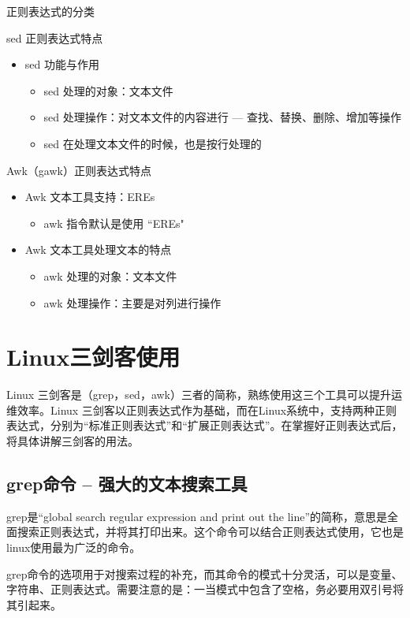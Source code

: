 \begin{ascolorbox5}{正则表达式的分类}
\begin{ascboxB}{sed 正则表达式特点}
\begin{itemize}
\item sed 功能与作用
	\begin{itemize}
	\item sed 处理的对象：文本文件
	\item sed 处理操作：对文本文件的内容进行 --- 查找、替换、删除、增加等操作
	\item sed 在处理文本文件的时候，也是按行处理的
\end{itemize}
	\end{itemize}
	\end{ascboxB}
	\begin{ascboxB}{Awk（gawk）正则表达式特点}
	\begin{itemize}
		\item Awk 文本工具支持：EREs
		\begin{itemize}
			\item awk 指令默认是使用 “EREs"
		\end{itemize}
		\item Awk 文本工具处理文本的特点
		\begin{itemize}
			\item awk 处理的对象：文本文件
			\item awk 处理操作：主要是对列进行操作
		\end{itemize}
	\end{itemize}
\end{ascboxB}
\end{ascolorbox5}

\section{Linux三剑客使用}
Linux 三剑客是（grep，sed，awk）三者的简称，熟练使用这三个工具可以提升运维效率。Linux 三剑客以正则表达式作为基础，而在Linux系统中，支持两种正则表达式，分别为“标准正则表达式”和“扩展正则表达式”。在掌握好正则表达式后，将具体讲解三剑客的用法。

\subsection{grep命令 – 强大的文本搜索工具}
grep是“global search regular expression and print out the line”的简称，意思是全面搜索正则表达式，并将其打印出来。这个命令可以结合正则表达式使用，它也是linux使用最为广泛的命令。

grep命令的选项用于对搜索过程的补充，而其命令的模式十分灵活，可以是变量、字符串、正则表达式。需要注意的是：一当模式中包含了空格，务必要用双引号将其引起来。

